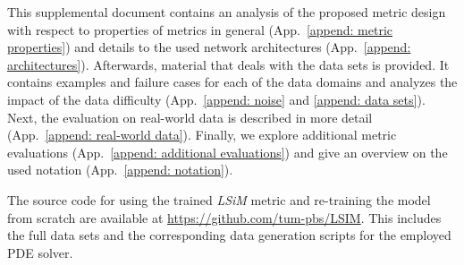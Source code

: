 
\renewcommand\thesection{\Alph{section}}



This supplemental document contains an analysis of the proposed metric design with respect to properties of metrics in general (App.~\ref{append: metric properties}) and details to the used network architectures (App.~\ref{append: architectures}). Afterwards, material that deals with the data sets is provided. It contains examples and failure cases for each of the data domains and analyzes the impact of the data difficulty (App.~\ref{append: noise} and \ref{append: data sets}). Next, the evaluation on real-world data is described in more detail (App.~\ref{append: real-world data}).
Finally, we explore additional metric evaluations (App.~\ref{append: additional evaluations}) and give an overview on the used notation (App.~\ref{append: notation}).

The source code for using the trained \textit{LSiM} metric and re-training the model from scratch are available at \url{https://github.com/tum-pbs/LSIM}. This includes the full data sets and the corresponding data generation scripts for the employed PDE solver.


